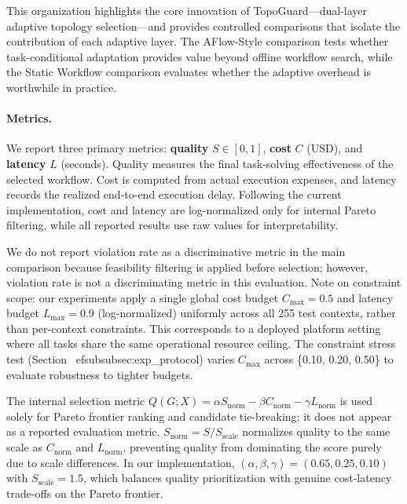 \documentclass[manuscript,review,anonymous]{acmart}
\begin{document}
This organization highlights the core innovation of TopoGuard---dual-layer adaptive topology selection---and provides controlled comparisons that isolate the contribution of each adaptive layer. The AFlow-Style comparison tests whether task-conditional adaptation provides value beyond offline workflow search, while the Static Workflow comparison evaluates whether the adaptive overhead is worthwhile in practice.


\paragraph{Metrics.}
We report three primary metrics: \textbf{quality} $S\in[0,1]$, \textbf{cost} $C$ (USD), and \textbf{latency} $L$ (seconds).
Quality measures the final task-solving effectiveness of the selected workflow.
Cost is computed from actual execution expenses, and latency records the realized end-to-end execution delay.
Following the current implementation, cost and latency are log-normalized only for internal Pareto filtering, while all reported results use raw values for interpretability.

We do not report violation rate as a discriminative metric in the main comparison because feasibility filtering is applied before selection; however, violation rate is not a discriminating metric in this evaluation. Note on constraint scope: our experiments apply a single global cost budget $C_{\max}=0.5$ and latency budget $L_{\max}=0.9$ (log-normalized) uniformly across all 255 test contexts, rather than per-context constraints. This corresponds to a deployed platform setting where all tasks share the same operational resource ceiling. The constraint stress test (Section~
ef{subsubsec:exp_protocol}) varies $C_{\max}$ across \{0.10, 0.20, 0.50\} to evaluate robustness to tighter budgets.


The internal selection metric $Q(G;X)=\alpha S_{\text{norm}}-\beta C_{\text{norm}}-\gamma L_{\text{norm}}$ is used solely for Pareto frontier ranking and candidate tie-breaking; it does not appear as a reported evaluation metric. $S_{\text{norm}}=S / S_{\text{scale}}$ normalizes quality to the same scale as $C_{\text{norm}}$ and $L_{\text{norm}}$, preventing quality from dominating the score purely due to scale differences. In our implementation, $(\alpha,\beta,\gamma)=(0.65,0.25,0.10)$ with $S_{\text{scale}}=1.5$, which balances quality prioritization with genuine cost-latency trade-offs on the Pareto frontier.
\end{document}
